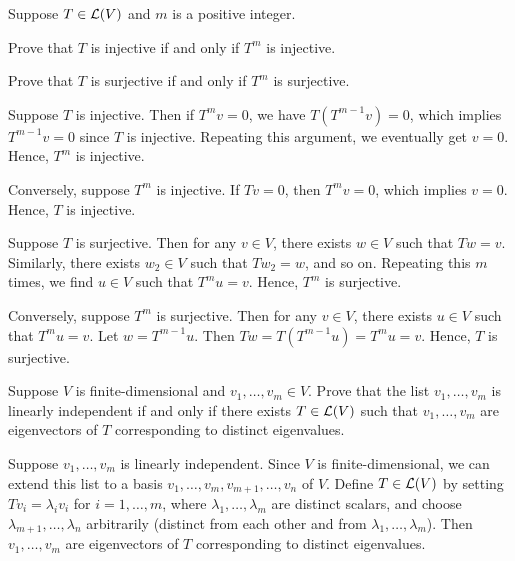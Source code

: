 \begin{exc}
\begin{exercise}
Suppose $T\in\mathcal{L}(V)$ and $m$ is a positive integer.
\begin{parts}
\item Prove that $T$ is injective if and only if $T^m$ is injective.
\item Prove that $T$ is surjective if and only if $T^m$ is surjective.
\end{parts}
\end{exercise}
\begin{solution}
\begin{parts}
\item Suppose $T$ is injective. Then if $T^mv=0$, we have $T(T^{m-1}v)=0$,
  which implies $T^{m-1}v=0$ since $T$ is injective. Repeating this argument,
  we eventually get $v=0$. Hence, $T^m$ is injective.

  Conversely, suppose $T^m$ is injective. If $Tv=0$, then $T^mv=0$, which
  implies $v=0$. Hence, $T$ is injective.
\item Suppose $T$ is surjective. Then for any $v\in V$, there exists $w\in V$
  such that $Tw=v$. Similarly, there exists $w_2\in V$ such that $Tw_2=w$, and
  so on. Repeating this $m$ times, we find $u\in V$ such that $T^mu=v$. Hence,
  $T^m$ is surjective.

  Conversely, suppose $T^m$ is surjective. Then for any $v\in V$, there exists
  $u\in V$ such that $T^mu=v$. Let $w=T^{m-1}u$. Then
  $Tw=T(T^{m-1}u)=T^mu=v$. Hence, $T$ is surjective. \qedhere
\end{parts}
\end{solution}

\begin{exercise}
Suppose $V$ is finite-dimensional and $v_1,\dots,v_m\in V$. Prove that the list
$v_1,\dots,v_m$ is linearly independent if and only if there exists
$T\in\mathcal{L}(V)$ such that $v_1,\dots,v_m$ are eigenvectors of $T$ corresponding
to distinct eigenvalues.
\end{exercise}
\begin{solution}
Suppose $v_1,\dots,v_m$ is linearly independent. Since $V$ is
finite-dimensional, we can extend this list to a basis
$v_1,\dots,v_m,v_{m+1},\dots,v_n$ of $V$. Define $T\in\mathcal{L}(V)$ by setting
$Tv_i=\lambda_iv_i$ for $i=1,\dots,m$, where $\lambda_1,\dots,\lambda_m$ are
distinct scalars, and choose $\lambda_{m+1},\dots,\lambda_n$ arbitrarily
(distinct from each other and from $\lambda_1,\dots,\lambda_m$). Then
$v_1,\dots,v_m$ are eigenvectors of $T$ corresponding to distinct
eigenvalues.


\end{solution}
\end{exc}

